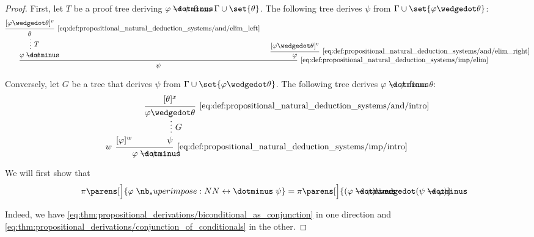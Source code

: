 \begin{proof}

  First, let \( T \) be a proof tree deriving \( \varphi \synimplies \psi \) from \( \Gamma \cup \set{ \theta } \). The following tree derives \( \psi \) from \( \Gamma \cup \set{ \varphi \synwedge \theta } \):
  \begin{equation*}
    \begin{prooftree}
      \hypo{ [\varphi \synwedge \theta]^v }
      \infer1[\ref{eq:def:propositional_natural_deduction_systems/and/elim_left}]{ \theta }

      \ellipsis {\( T \)} {\varphi \synimplies \psi}

      \hypo{ [\varphi \synwedge \theta]^v }
      \infer1[\ref{eq:def:propositional_natural_deduction_systems/and/elim_right}]{ \varphi }

      \infer2[\ref{eq:def:propositional_natural_deduction_systems/imp/elim}]{ \psi }
    \end{prooftree}
  \end{equation*}

  Conversely, let \( G \) be a tree that derives \( \psi \) from \( \Gamma \cup \set{ \varphi \synwedge \theta } \). The following tree derives \( \varphi \synimplies \psi \) from \( \theta \):
  \begin{equation*}
    \begin{prooftree}
      \hypo{ [\varphi]^w }
      \hypo{ [\theta]^x }
      \infer1[\ref{eq:def:propositional_natural_deduction_systems/and/intro}]{ \varphi \synwedge \theta }

      \ellipsis {\( G \)} {\psi}

      \infer[left label=\( w \)]2[\ref{eq:def:propositional_natural_deduction_systems/imp/intro}]{ \varphi \synimplies \psi }
    \end{prooftree}
  \end{equation*}

   We will first show that
  \begin{equation*}
    \pi\parens[\Big]{ \varphi \syniff \psi } = \pi\parens[\Big]{ (\varphi \synimplies \psi) \synwedge (\psi \synimplies \varphi) }.
  \end{equation*}

  Indeed, we have \eqref{eq:thm:propositional_derivations/biconditional_as_conjunction} in one direction and \eqref{eq:thm:propositional_derivations/conjunction_of_conditionals} in the other.


\end{proof}
